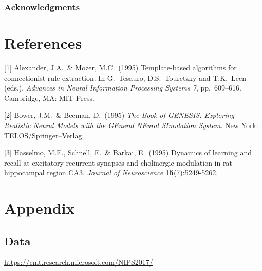 \documentclass{article}
\begin{document}
\subsubsection*{Acknowledgments}

\section*{References}

\small

[1] Alexander, J.A.\ \& Mozer, M.C.\ (1995) Template-based algorithms
for connectionist rule extraction. In G.\ Tesauro, D.S.\ Touretzky and
T.K.\ Leen (eds.), {\it Advances in Neural Information Processing
  Systems 7}, pp.\ 609--616. Cambridge, MA: MIT Press.

[2] Bower, J.M.\ \& Beeman, D.\ (1995) {\it The Book of GENESIS:
  Exploring Realistic Neural Models with the GEneral NEural SImulation
  System.}  New York: TELOS/Springer--Verlag.

[3] Hasselmo, M.E., Schnell, E.\ \& Barkai, E.\ (1995) Dynamics of
learning and recall at excitatory recurrent synapses and cholinergic
modulation in rat hippocampal region CA3. {\it Journal of
  Neuroscience} {\bf 15}(7):5249-5262.

\section*{Appendix}
\subsection*{Data}
\begin{center}
  \url{https://cmt.research.microsoft.com/NIPS2017/}
\end{center}
\end{document}

